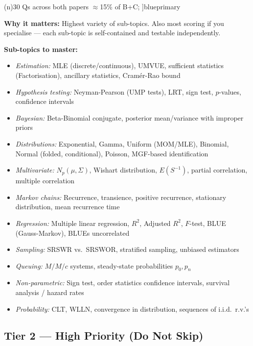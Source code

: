 \documentclass[12pt,a4paper]{article}
\newcommand{\badge}[2]{%
  \tikz[baseline=(n.base)]\node[fill=#1!20, draw=#1!60, text=#1!80!black,
    rounded corners=3pt, inner xsep=5pt, inner ysep=2pt,
    font=\tiny\bfseries](n){#2};%
}
\newcommand{\badgeblue}[1]{\badge{blueprimary}{#1}}
\begin{document}
\begin{prioritybox}[3.\quad Statistics \& Probability \hfill\badgeblue{30 Qs across both papers $\approx$15\% of B+C}]{blueprimary}

\textbf{Why it matters:} Highest variety of sub-topics. Also most scoring if you specialise — each sub-topic is self-contained and testable independently.

\medskip
\textbf{Sub-topics to master:}
\begin{itemize}[leftmargin=1.5em, itemsep=2pt]
  \item \textit{Estimation:} MLE (discrete/continuous), UMVUE, sufficient statistics (Factorisation), ancillary statistics, Cramér-Rao bound
  \item \textit{Hypothesis testing:} Neyman-Pearson (UMP tests), LRT, sign test, $p$-values, confidence intervals
  \item \textit{Bayesian:} Beta-Binomial conjugate, posterior mean/variance with improper priors
  \item \textit{Distributions:} Exponential, Gamma, Uniform (MOM/MLE), Binomial, Normal (folded, conditional), Poisson, MGF-based identification
  \item \textit{Multivariate:} $N_p(\mu,\Sigma)$, Wishart distribution, $E(S^{-1})$, partial correlation, multiple correlation
  \item \textit{Markov chains:} Recurrence, transience, positive recurrence, stationary distribution, mean recurrence time
  \item \textit{Regression:} Multiple linear regression, $R^2$, Adjusted $R^2$, $F$-test, BLUE (Gauss-Markov), BLUEs uncorrelated
  \item \textit{Sampling:} SRSWR vs.\ SRSWOR, stratified sampling, unbiased estimators
  \item \textit{Queuing:} $M/M/c$ systems, steady-state probabilities $p_0, p_n$
  \item \textit{Non-parametric:} Sign test, order statistics confidence intervals, survival analysis / hazard rates
  \item \textit{Probability:} CLT, WLLN, convergence in distribution, sequences of i.i.d.\ r.v.'s
\end{itemize}
\end{prioritybox}

\subsection{Tier 2 — High Priority (Do Not Skip)}
\end{document}

